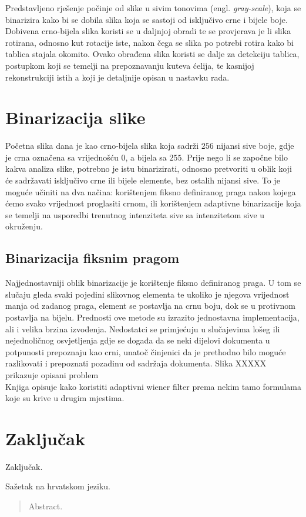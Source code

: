 \documentclass[times, utf8, zavrsni, numeric]{fer}
\begin{document}
Predstavljeno rješenje počinje od slike u sivim tonovima (engl. \textit{gray-scale}), koja se binarizira kako bi se dobila slika koja se sastoji od isključivo crne i bijele boje.
Dobivena crno-bijela slika koristi se u daljnjoj obradi te se provjerava je li slika rotirana, odnosno kut rotacije iste, nakon čega se slika po potrebi rotira kako bi tablica stajala okomito.
Ovako obrađena slika koristi se dalje za detekciju tablica, postupkom koji se temelji na prepoznavanju kuteva ćelija, te kasnijoj rekonstrukciji istih a koji je detaljnije opisan u nastavku rada.


\chapter{Binarizacija slike}
Početna slika dana je kao crno-bijela slika koja sadrži $256$ nijansi sive boje, gdje je crna označena sa vrijednošću $0$, a bijela sa $255$.
Prije nego li se započne bilo kakva analiza slike, potrebno je istu binarizirati, odnosno pretvoriti u oblik koji će sadržavati isključivo crne ili bijele elemente, bez ostalih nijansi sive.
To je moguće učiniti na dva načina: korištenjem fiksno definiranog praga nakon kojega ćemo svako vrijednost proglasiti crnom, ili korištenjem adaptivne binarizacije koja se temelji na usporedbi trenutnog intenziteta sive sa intenzitetom sive u okruženju.

\section{Binarizacija fiksnim pragom}
Najjednostavniji oblik binarizacije je korištenje fiksno definiranog praga.
U tom se slučaju gleda svaki pojedini slikovnog elementa te ukoliko je njegova vrijednost manja od zadanog praga, element se postavlja na crnu boju, dok se u protivnom postavlja na bijelu.
Prednosti ove metode su izrazito jednostavna implementacija, ali i velika brzina izvođenja. 
Nedostatci se primjećuju u slučajevima lošeg ili nejednoličnog osvjetljenja gdje se događa da se neki dijelovi dokumenta u potpunosti prepoznaju kao crni, unatoč činjenici da je prethodno bilo moguće razlikovati i prepoznati pozadinu od sadržaja dokumenta.
Slika XXXXX prikazuje opisani problem \\

Knjiga \cite{book:Two-Dimensional-Signal-Image-Processing} opisuje kako koristiti adaptivni wiener filter prema nekim tamo formulama koje su krive u drugim mjestima. 

\chapter{Zaključak}
Zaključak.





\begin{sazetak}
Sažetak na hrvatskom jeziku.

\end{sazetak}

\begin{abstract}
Abstract.

\end{abstract}
\end{document}

